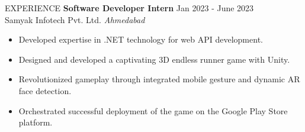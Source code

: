 \documentclass{resume} %
\begin{document}
\begin{rSection}{EXPERIENCE}
\textbf{Software Developer Intern} \hfill Jan 2023 - June 2023\\
Samyak Infotech Pvt. Ltd. \hfill \textit{Ahmedabad}
\begin{itemize}
    \itemsep -3pt {}
     \item Developed expertise in .NET technology for web API development.
     \item Designed and developed a captivating 3D endless runner game with Unity.
     \item Revolutionized gameplay through integrated mobile gesture and dynamic AR face detection.
     \item Orchestrated successful deployment of the game on the Google Play Store platform.
\end{itemize}

\end{rSection}

\end{document}
